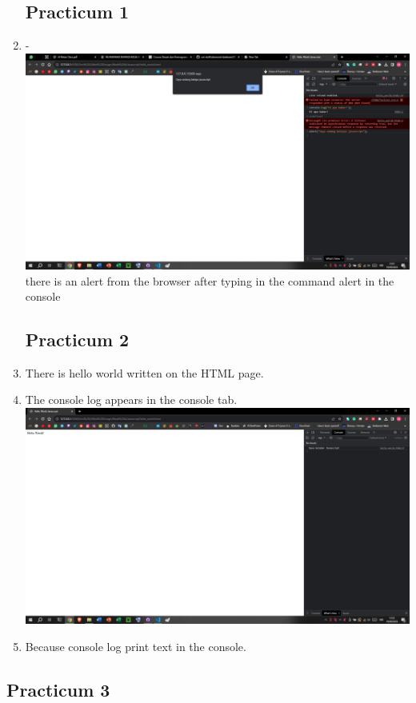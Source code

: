 \documentclass[12pt,titlepage]{article}
\begin{document}
\begin{enumerate}
    \subsection*{Practicum 1}
    \item - \\ \includegraphics[width=.9\textwidth]{images/figures/fig1.png} \\ there is an alert from the browser after typing in the command alert in the console
    \subsection*{Practicum 2}
    \item There is hello world written on the HTML page.
    \item The console log appears in the console tab. \\ \includegraphics[width=.9\textwidth]{images/figures/fig2.png}
    \item Because console log print text in the console. 
\end{enumerate}

\subsection*{Practicum 3}
\end{document}
